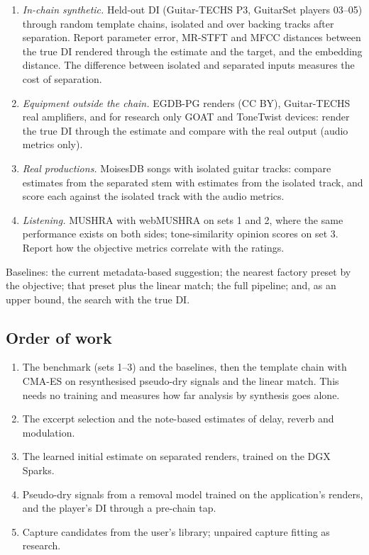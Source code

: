 \begin{enumerate}
\item \emph{In-chain synthetic.} Held-out DI (Guitar-TECHS P3, GuitarSet
players 03--05) through random template chains, isolated and over backing
tracks after separation. Report parameter error, MR-STFT and MFCC distances
between the true DI rendered through the estimate and the target, and the
embedding distance. The difference between isolated and separated inputs
measures the cost of separation.
\item \emph{Equipment outside the chain.} EGDB-PG renders (CC BY), Guitar-TECHS
real amplifiers, and for research only GOAT and ToneTwist devices: render the
true DI through the estimate and compare with the real output (audio metrics
only).
\item \emph{Real productions.} MoisesDB songs with isolated guitar tracks:
compare estimates from the separated stem with estimates from the isolated
track, and score each against the isolated track with the audio metrics.
\item \emph{Listening.} MUSHRA with webMUSHRA on sets 1 and 2, where the same
performance exists on both sides; tone-similarity opinion scores on set 3.
Report how the objective metrics correlate with the ratings.
\end{enumerate}
Baselines: the current metadata-based suggestion; the nearest factory preset
by the objective; that preset plus the linear match; the full pipeline; and,
as an upper bound, the search with the true DI.

\subsection{Order of work}

\begin{enumerate}
\item The benchmark (sets 1--3) and the baselines, then the template chain with
CMA-ES on resynthesised pseudo-dry signals and the linear match. This needs
no training and measures how far analysis by synthesis goes alone.
\item The excerpt selection and the note-based estimates of delay, reverb and
modulation.
\item The learned initial estimate on separated renders, trained on the DGX
Sparks.
\item Pseudo-dry signals from a removal model trained on the application's
renders, and the player's DI through a pre-chain tap.
\item Capture candidates from the user's library; unpaired capture fitting as
research.
\end{enumerate}
